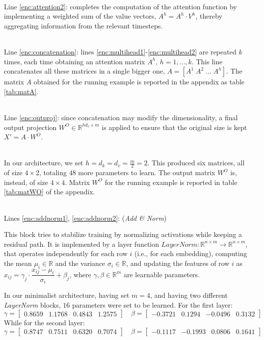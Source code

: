 \documentclass[algorithms,article,submit,pdftex,moreauthors]{Definitions/mdpi}
\begin{document}
~\\Line \ref{enc:attention2}: completes the computation of the attention function by implementing a weighted sum of the value vectors, $A^h = A^h \cdot V^h$, thereby aggregating information from the relevant timesteps.

~\\Line \ref{enc:concatenation}: lines \ref{enc:multihead1}-\ref{enc:multihead2} are repeated $k$ times, each time obtaining an attention matrix $A^h$, $h=1,\dots,k$. This line concatenates all these matrices in a single bigger one, $A = [A^1\;A^2\;...\;A^h]$. The matrix $A$ obtained for the running example is reported in the appendix as table \ref{tab:matA}.

~\\Line \ref{enc:outproj}: since concatenation may modify the dimensionality, a final output projection $W^O \in \mathbb{R}^{hd_v \times m}$ is applied to ensure that the original size is kept $X' = A \cdot W^O$. 

~\\In our architecture, we set $h = d_k = d_v = \frac{m}{2} = 2$. This produced six matrices, all of size $4 \times 2$, totaling $48$ more parameters to learn. The output matrix $W^O$ is, instead, of size $4 \times 4$. Matrix $W^O$ for the running example is reported in table \ref{tab:matWO} of the appendix.

~\\Lines \ref{enc:addnorm1}, \ref{enc:addnorm2}: (\textit{Add \& Norm})

This block tries to stabilize training by normalizing activations while keeping a residual path. It is implemented by a layer function $LayerNorm : \mathbb{R}^{n \times m} \to \mathbb{R}^{n \times m}$, that operates independently for each row $i$ (i.e., for each embedding), computing the mean $\mu_i \in \mathbb{R}$ and the variance $\sigma_i \in \mathbb{R}$, and updating the features of row $i$ as $ x_{ij} = \gamma_j\cdot\dfrac{x_{ij} - \mu_i}{\sigma_i} + \beta_j$, 
where $\gamma,\beta \in \mathbb{R}^m$ are learnable parameters.

In our minimalist architecture, having set $m = 4$, and having two different \textit{LayerNorm} blocks, $16$ parameters were set to be learned. For the first layer:
$$
    \gamma =    \begin{bmatrix}
                    0.8659 & 1.1768 & 0.4843 & 1.2575
                \end{bmatrix} \quad
    \beta =     \begin{bmatrix}
                -0.3721 & 0.1294 & -0.0496 & 0.3132
                \end{bmatrix}
$$
While for the second layer:
$$
    \gamma =    \begin{bmatrix}
                    0.8747 & 0.7511 & 0.6320 & 0.7074
                \end{bmatrix} \quad
    \beta =     \begin{bmatrix}
                    -0.1117 & -0.1993 & 0.0806 & 0.1641
                \end{bmatrix}
$$
\end{document}
